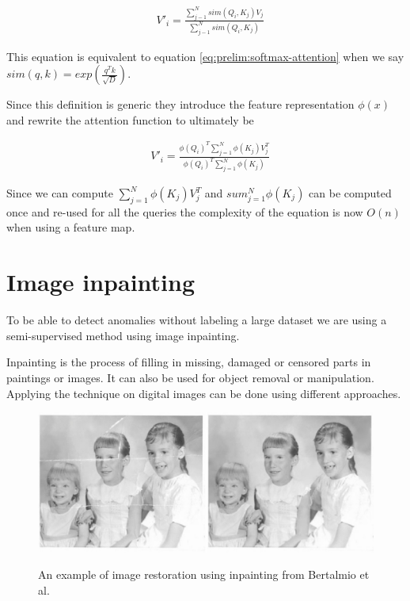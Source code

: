 \begin{align}
&V'_i =\frac{\sum_{j-1} ^{N} sim(Q_i, K_j) V_j}{\sum_{j-1} ^{N} sim(Q_i, K_j)}
\end{align}

This equation is equivalent to equation \ref{eq:prelim:softmax-attention} when we say $sim(q, k) = exp(\frac{q^Tk}{\sqrt{D}})$.

Since this definition is generic they introduce the feature representation $\phi(x)$ and rewrite the attention function to ultimately be

\begin{align}
    &V'_i = \frac{\phi(Q_i)^T\sum_{j=1}^{N} \phi(K_j)V_j^T}{\phi(Q_i)^T\sum_{j=1}^{N} \phi(K_j)}
\end{align}

Since we can compute $\sum_{j=1}^{N} \phi(K_j)V_j^T$ and $sum_{j=1}^{N} \phi(K_j)$ can be computed once and re-used for all the queries the complexity of the equation is now $O(n)$ when using a feature map.

\section{Image inpainting}
\label{sec:prelim:image-inpainting}

To be able to detect anomalies without labeling a large dataset we are using a semi-supervised method using image inpainting.

Inpainting is the process of filling in missing, damaged or censored parts in paintings or images. It can also be used for object removal or manipulation.
Applying the technique on digital images can be done using different approaches.

\begin{figure}[ht!]
\caption{An example of image restoration using inpainting from Bertalmio et al. \cite{bertalmio_image_2000}}
\centering
\includegraphics[width=\textwidth]{imgs/inpainting-example.jpeg}
\label{fig:prelim:inpainting-example}
\end{figure}

